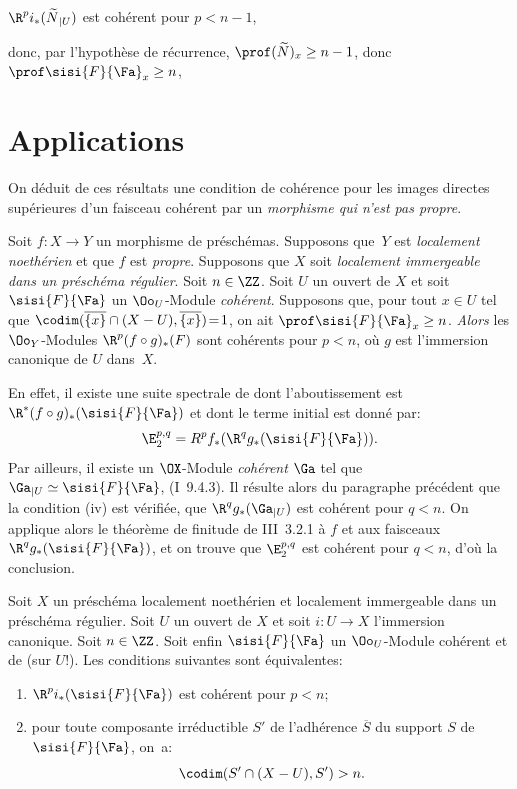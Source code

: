 $\R^pi_\ast(\widetilde{N}{}_{|U})$ est coh\'erent pour $p<n-1$,

\noindent donc, par l'hypoth\`ese de r\'ecurrence, $\prof(\widetilde{N})_x\geq n-1$, donc $\prof \sisi{F}{{\Fa}}_x\geq n$, 

\section{Applications} \label{VIII.3}

On d\'eduit de ces r\'esultats une condition de coh\'erence pour les images directes sup\'erieures d'un faisceau coh\'erent par un \emph{morphisme qui n'est pas propre}.

\begin{theoreme} \label{VIII.3.1}
Soit $f\colon X\to Y$ un morphisme de pr\'esch\'emas. Supposons que~$Y$ est \emph{localement noeth\'erien} et que $f$ est \emph{propre}. Supposons que $X$ soit \emph{localement immergeable dans un pr\'esch\'ema r\'egulier}. Soit $n\in\ZZ$. Soit $U$ un ouvert de $X$ et soit $\sisi{F}{{\Fa}}$ un $\Oo_U$-Module \emph{coh\'erent}. Supposons que, pour tout $x\in U$ tel que \hbox{$\codim(\overline{\{x\}}\cap (X-U), \overline{\{x\}})\!=\!1$}, on ait $\prof\sisi{F}{{\Fa}}_x\geq n$. \emph{Alors} les $\Oo_Y$-Modules \hbox{$\R^p(f\circ g)_\ast(F)$} sont coh\'erents pour $p<n$, o\`u $g$ est l'immersion canonique de $U$ dans~$X$.
\end{theoreme}

En effet, il existe une suite spectrale de  dont l'aboutissement est $\R^\ast(f\circ g)_\ast(\sisi{F}{{\Fa}})$ et dont le terme initial est donn\'e par:
\[
\E^{p, q}_2=R^pf_\ast(\R^qg_\ast(\sisi{F}{{\Fa}})).
\]
Par ailleurs, il existe un $\OX$-Module \emph{coh\'erent} ${\Ga}$ tel que ${\Ga}{}_{|U}\simeq \sisi{F}{{\Fa}}$, (\EGA I~9.4.3). Il r\'esulte alors du paragraphe pr\'ec\'edent que la condition (iv)  est v\'erifi\'ee\pageoriginale, \ie que $\R^qg_\ast({\Ga}{}_{|U})$ est coh\'erent pour $q<n$. On applique alors le th\'eor\`eme de finitude de \EGA III~3.2.1 \`a $f$ et aux faisceaux $\R^qg_\ast(\sisi{F}{{\Fa}})$, et on trouve que $\E^{p, q}_2$ est coh\'erent pour $q<n$, d'o\`u la conclusion.

\begin{proposition} \label{VIII.3.2} Soit $X$ un pr\'esch\'ema localement noeth\'erien et localement immergeable dans un pr\'esch\'ema r\'egulier. Soit $U$ un ouvert de $X$ et soit $i\colon U\to X$ l'immersion canonique. Soit $n\in\ZZ$. Soit enfin $\sisi{F}{{\Fa}}$ un $\Oo_U$-Module coh\'erent et de \emph{} (sur $U$!). Les conditions suivantes sont \'equivalentes:
\begin{enumerate}
\item[(a)]
$\R^pi_\ast(\sisi{F}{{\Fa}})$ est coh\'erent pour $p<n$;

\item[(b)]
pour toute composante irr\'eductible $S'$ de l'adh\'erence $\overline S$ du support $S$ de $\sisi{F}{{\Fa}}$, on~a:
\[
\codim (S'\cap (X-U), S')>n.
\]
\end{enumerate}
\end{proposition}

